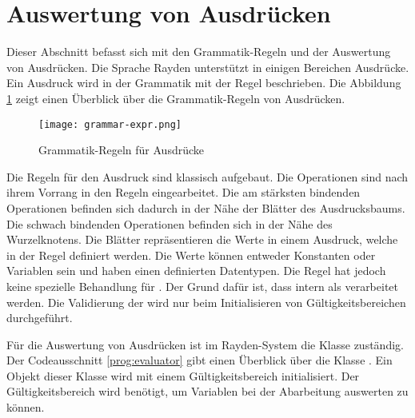 \clearpage

\section{Auswertung von Ausdrücken}
\label{cha:Eval}

Dieser Abschnitt befasst sich mit den Grammatik-Regeln und der Auswertung von Ausdrücken. Die Sprache Rayden unterstützt in einigen Bereichen Ausdrücke. Ein Ausdruck wird in der Grammatik mit der Regel  beschrieben. Die Abbildung \ref{fig:exprGrammar} zeigt einen Überblick über die Grammatik-Regeln von Ausdrücken. 

\begin{figure}
\centering
\texttt{[image: grammar-expr.png]}
\caption{Grammatik-Regeln für Ausdrücke}
\label{fig:exprGrammar}
\end{figure}

\SuperPar
Die Regeln für den Ausdruck sind klassisch aufgebaut. Die Operationen sind nach ihrem Vorrang in den Regeln eingearbeitet. Die am stärksten bindenden Operationen befinden sich dadurch in der Nähe der Blätter des Ausdrucksbaums. Die schwach bindenden Operationen befinden sich in der Nähe des Wurzelknotens. Die Blätter repräsentieren die Werte in einem Ausdruck, welche in der Regel  definiert werden. Die Werte können entweder Konstanten oder Variablen sein und haben einen definierten Datentypen. Die Regel  hat jedoch keine spezielle Behandlung für . Der Grund dafür ist, dass  intern als  verarbeitet werden. Die Validierung der  wird nur beim Initialisieren von Gültigkeitsbereichen durchgeführt.

\SuperPar
Für die Auswertung von Ausdrücken ist im Rayden-System die Klasse  zuständig. Der Codeausschnitt \ref{prog:evaluator} gibt einen Überblick über die Klasse . Ein Objekt dieser Klasse wird mit einem Gültigkeitsbereich initialisiert. Der Gültigkeitsbereich wird benötigt, um Variablen bei der Abarbeitung auswerten zu können. 

